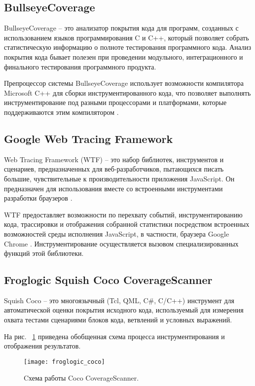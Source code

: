 \subsection{BullseyeCoverage}
BullseyeCoverage -- это анализатор покрытия кода для программ, созданных с использованием языков программирования C и C++, который позволяет собрать статистическую информацию о полноте тестирования программного кода. Анализ покрытия кода бывает полезен при проведении модульного, интеграционного и финального тестирования программного продукта.

Препроцессор системы BullseyeCoverage использует возможности компилятора Microsoft C++ для сборки инструментированного кода, что позволяет выполнять инструментирование под разными процессорами и платформами, которые поддерживаются этим компилятором \cite{reviewBullseyeCoverage}.

\subsection{Google Web Tracing Framework}
Web Tracing Framework (WTF) -- это набор библиотек, инструментов и сценариев, предназначенных для веб-разработчиков, пытающихся писать большие, чувствительные к производительности приложения JavaScript. Он предназначен для использования вместе со встроенными инструментами разработки браузеров \cite{reviewWTF}. 

WTF предоставляет возможности по перехвату событий, инструментированию кода, трассировки и отображения собранной статистики посредством встроенных возможностей среды исполнения JavaScript, в частности, браузера Google Chrome \cite{reviewWTF}. Инструментирование осуществляется вызовом специализированных функций этой библиотеки.

\subsection{Froglogic Squish Coco CoverageScanner}
Squish Coco -- это многоязычный (Tcl, QML, C\#, C/C++) инструмент для автоматической оценки покрытия исходного кода, используемый для измерения охвата тестами сценариями блоков кода, ветвлений и условных выражений.

На рис. ~\ref{fig:froglogic_coco} приведена обобщенная схема процесса инструментирования и отображения результатов.

\begin{figure}[!h]
	\centering
	\texttt{[image: froglogic\_coco]}
	\caption{Cхема работы Coco CoverageScanner.}
	\label{fig:froglogic_coco}
\end{figure}

